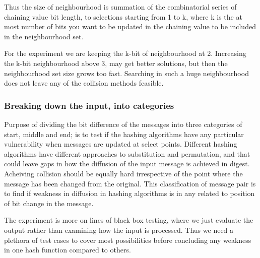 Thus the size of neighbourhood is summation of the combinatorial series of chaining value bit length, to selections
starting from 1 to k, where k is the at most number of bits you want to be updated in the chaining value to be
included in the neighbourhood set.

For the experiment we are keeping the k-bit of neighbourhood at 2. Increasing the k-bit neighbourhood above 3, 
may get better solutions, but then the neighbourhood set size grows too fast. Searching in such a huge neighbourhood
does not leave any of the collision methods feasible.

\subsubsection{Breaking down the input, into categories}
Purpose of dividing the bit difference of the messages into three categories of start, middle and end; is to test
if the hashing algorithms have any particular vulnerability when messages are updated at select points. Different
hashing algorithms have different approaches to substitution and permutation, and that could leave gaps in how
the diffusion of the input message is achieved in digest. Acheiving collision should be equally hard irrespective
of the point where the message has been changed from the original. This classification of message pair is to
find if weakness in diffusion in hashing algorithms is in any related to position of bit change in the message.

The experiment is more on lines of black box testing, where we just evaluate the output rather than examining
how the input is processed. Thus we need a plethora of test cases to cover most possibilities before concluding
any weakness in one hash function compared to others. 

